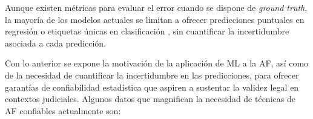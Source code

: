 Aunque existen métricas para evaluar el error cuando se dispone de \textit{ground truth}, la mayoría de los 
modelos actuales se limitan a ofrecer predicciones puntuales en regresión 
\cite{park2024, imaizumi2021, stepanovsky2024} o etiquetas únicas en clasificación 
\cite{venema2022, park2024}, sin cuantificar la incertidumbre asociada a cada predicción.

Con lo anterior se expone la motivación de la aplicación de ML a la AF, así como de la necesidad de 
cuantificar la incertidumbre en las predicciones, para ofrecer garantías de confiabilidad estadística que 
aspiren a sustentar la validez legal en contextos judiciales. Algunos datos que magnifican la necesidad de 
técnicas de AF confiables actualmente son:


